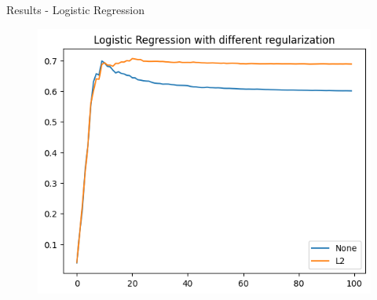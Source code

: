 \documentclass{beamer}
\begin{document}
\begin{frame}[t]{Results - Logistic Regression}
	\vspace{-3mm}
	\begin{figure}[h]
		\centering
		\includegraphics[width=0.8\linewidth]{images/LogisticRegression/none_l2_regularization.png}
	\end{figure}
\end{frame}
\end{document}
